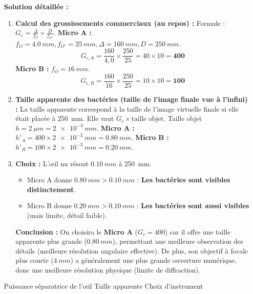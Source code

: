 \documentclass[11pt]{article}
\newcommand{\cle}[1]{{\popxbold\color{popdark}#1}}
\begin{document}
\begin{exoresolu}
\tcblower
\textbf{Solution détaillée :}
\begin{enumerate}
    \item \textbf{Calcul des grossissements commerciaux (au repos) :}
    Formule : $G_c = \frac{\Delta}{f_O} \times \frac{D}{f_{O'}}$.
    \textbf{Micro A :} $f_O = \SI{4,0}{mm}, f_{O'} = \SI{25}{mm}, \Delta = \SI{160}{mm}, D = \SI{250}{mm}$.
    \[ G_{c,A} = \frac{160}{4,0} \times \frac{250}{25} = 40 \times 10 = \mathbf{400} \]
    \textbf{Micro B :} $f_O = \SI{16}{mm}$.
    \[ G_{c,B} = \frac{160}{16} \times \frac{250}{25} = 10 \times 10 = \mathbf{100} \]
    \item \textbf{Taille apparente des bactéries (taille de l'image finale vue à l'infini) :}
    La taille apparente correspond à la taille de l'image virtuelle finale si elle était placée à \SI{250}{mm}. Elle vaut $G_c \times \text{taille objet}$.
    Taille objet $h = \SI{2}{\mu m} = \SI{2e-3}{mm}$.
    \textbf{Micro A :} $h'_{A} = 400 \times \SI{2e-3}{mm} = \SI{0,80}{mm}$.
    \textbf{Micro B :} $h'_{B} = 100 \times \SI{2e-3}{mm} = \SI{0,20}{mm}$.
    \item \textbf{Choix :} L'œil nu résout $\SI{0,10}{mm}$ à \SI{250}{mm}.
    \begin{itemize}
        \item Micro A donne $\SI{0,80}{mm} > \SI{0,10}{mm}$ : \textbf{Les bactéries sont visibles distinctement}.
        \item Micro B donne $\SI{0,20}{mm} > \SI{0,10}{mm}$ : \textbf{Les bactéries sont aussi visibles} (mais limite, détail faible).
    \end{itemize}
    \textbf{Conclusion :} On choisira le \textbf{Micro A} ($G_c = 400$) car il offre une taille apparente plus grande ($\SI{0,80}{mm}$), permettant une meilleure observation des détails (meilleure résolution angulaire effective). De plus, son objectif à focale plus courte ($\SI{4}{mm}$) a généralement une plus grande ouverture numérique, donc une meilleure résolution physique (limite de diffraction).
\end{enumerate}
\cle{Puissance séparatrice de l'œil} \cle{Taille apparente} \cle{Choix d'instrument}
\end{exoresolu}
\end{document}
